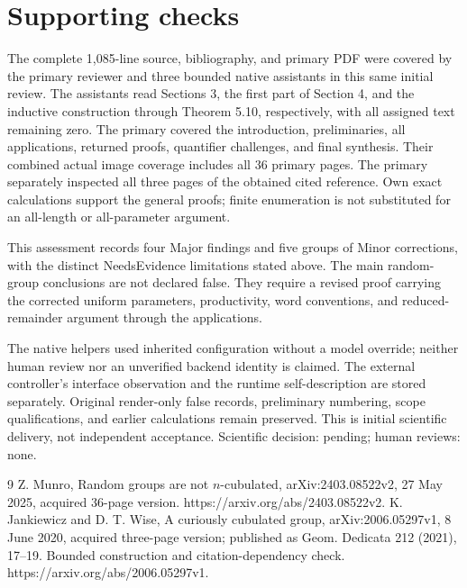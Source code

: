 \documentclass[10pt]{article}
\begin{document}
\section*{Supporting checks}
The complete 1,085-line source, bibliography, and primary PDF were covered by the primary reviewer and three bounded native assistants in this same initial review. The assistants read Sections 3, the first part of Section 4, and the inductive construction through Theorem 5.10, respectively, with all assigned text remaining zero. The primary covered the introduction, preliminaries, all applications, returned proofs, quantifier challenges, and final synthesis. Their combined actual image coverage includes all 36 primary pages. The primary separately inspected all three pages of the obtained cited reference. Own exact calculations support the general proofs; finite enumeration is not substituted for an all-length or all-parameter argument.\par
This assessment records four Major findings and five groups of Minor corrections, with the distinct NeedsEvidence limitations stated above. The main random-group conclusions are not declared false. They require a revised proof carrying the corrected uniform parameters, productivity, word conventions, and reduced-remainder argument through the applications.\par
The native helpers used inherited configuration without a model override; neither human review nor an unverified backend identity is claimed. The external controller’s interface observation and the runtime self-description are stored separately. Original render-only false records, preliminary numbering, scope qualifications, and earlier calculations remain preserved. This is initial scientific delivery, not independent acceptance. Scientific decision: pending; human reviews: none.\par
9 Z. Munro, Random groups are not \(n\)-cubulated, arXiv:2403.08522v2, 27 May 2025, acquired 36-page version. https://arxiv.org/abs/2403.08522v2. K. Jankiewicz and D. T. Wise, A curiously cubulated group, arXiv:2006.05297v1, 8 June 2020, acquired three-page version; published as Geom. Dedicata 212 (2021), 17–19. Bounded construction and citation-dependency check. https://arxiv.org/abs/2006.05297v1.\par
\end{document}
